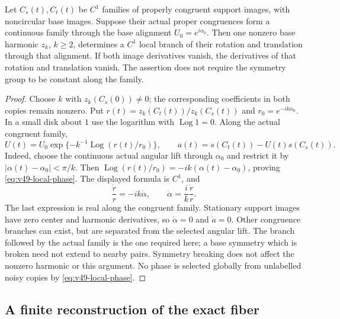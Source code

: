 \begin{lemma}
\label{lem:v49-local-alignment}
Let $C_s(t),C_t(t)$ be $C^1$ families of properly congruent support
images, with noncircular base images.  Suppose their actual proper congruences
form a continuous family through the base alignment $U_0=e^{i\alpha_0}$.
Then one nonzero base harmonic $z_k$,
$k\ge2$, determines a $C^1$ local branch of their rotation and
translation through that alignment.  If both image derivatives vanish,
the derivatives of that rotation and translation vanish.  The assertion
does not require the symmetry group to be constant along the family.
\end{lemma}
\begin{proof}
Choose $k$ with $z_k(C_s(0))\ne0$; the corresponding coefficients in
both copies remain nonzero.  Put $r(t)=z_k(C_t(t))/z_k(C_s(t))$ and
$r_0=e^{-ik\alpha_0}$.  In a small disk about $1$ use the logarithm
with $\operatorname{Log}1=0$.  Along the actual congruent family,
\begin{equation}\label{eq:v49-local-phase}
 U(t)=U_0\exp\{-k^{-1}\operatorname{Log}(r(t)/r_0)\},\qquad
 a(t)=s(C_t(t))-U(t)s(C_s(t)).
\end{equation}
Indeed, choose the continuous actual angular lift through $\alpha_0$
and restrict it by $|\alpha(t)-\alpha_0|<\pi/k$.  Then
$\operatorname{Log}(r(t)/r_0)=-ik(\alpha(t)-\alpha_0)$, proving
\eqref{eq:v49-local-phase}.  The displayed formula is $C^1$, and
\begin{equation}\label{eq:v49-angular-velocity}
             \frac{\dot r}{r}=-ik\dot\alpha,
                 \qquad \dot\alpha=\frac{i}{k}\frac{\dot r}{r}.
\end{equation}
The last expression is real along the congruent family.  Stationary
support images have zero center and harmonic derivatives, so
$\dot\alpha=0$ and $\dot a=0$.  Other congruence branches can exist,
but are separated from the selected angular lift.  The branch followed by the actual family is the one required here;
a base symmetry which is broken need not extend to nearby pairs.
Symmetry breaking does not affect the nonzero harmonic or this argument.  No phase is selected globally from unlabelled
noisy copies by \eqref{eq:v49-local-phase}.
\end{proof}

\subsection{A finite reconstruction of the exact fiber}

